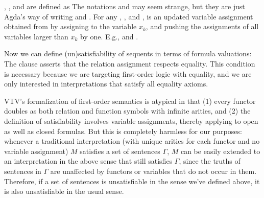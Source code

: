 \documentclass{lipics-v2021}
\begin{document}
, , and  are defined as
The notations 
    and
    
may seem strange, but they are just Agda's way of writing 
   and 
  .
For any , , and , 
\AgdaSymbol{(} \AgdaFunction{/}   \AgdaSymbol{)} 
is an updated variable assignment obtained from  by assigning 
 to the variable $x_k$, and pushing the assignments of all variables 
larger than $x_k$ by one.
E.g., \AgdaSymbol{(} 
\AgdaFunction{/}   \AgdaSymbol{)}
 \AgdaSymbol{=}  
and 
\AgdaSymbol{(} 
\AgdaFunction{/}   \AgdaSymbol{)} 
\AgdaSymbol{(} \AgdaSymbol{)} \AgdaSymbol{=}  .


Now we can define (un)satisfiability of sequents in terms of formula valuations: 
The \AgdaSpace{} clause asserts that the
relation assignment  respects equality. This condition is necessary
because we are targeting first-order logic with equality, and we are only 
interested in interpretations that satisfy all equality axioms.

VTV's formalization of first-order semantics is atypical in that (1) every functor
doubles as both relation and function symbols with infinite arities, and 
(2) the definition of satisfiability involves variable assignments, thereby applying to
open as well as closed formulas. But this is completely harmless for our purposes:
whenever a traditional interpretation (with unique arities for each functor and no 
variable assignment) $M$ satisfies a set of sentences $\Gamma$, $M$ can be easily extended 
to an interpretation in the above sense that still satisfies $\Gamma$, since the 
truths of sentences in $\Gamma$ are unaffected by functors or variables that do not 
occur in them. Therefore, if a set of sentences is unsatisfiable in the sense we've
defined above, it is also unsatisfiable in the usual sense. 
\end{document}
